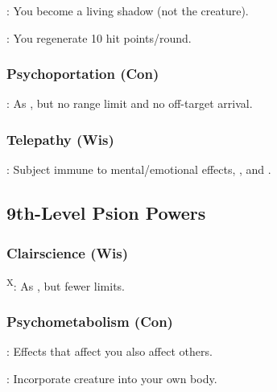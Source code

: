 : You become a living shadow (not the creature).

: You regenerate 10 hit points/round.


\subsubsection{Psychoportation (Con)}

: As , but no range limit and no off-target arrival.


\subsubsection{Telepathy (Wis)}

: Subject immune to mental/emotional effects, , and .



\subsection{9th-Level Psion Powers}


\subsubsection{Clairscience (Wis)}

\textsuperscript{X}: As , but fewer limits.






\subsubsection{Psychometabolism (Con)}

: Effects that affect you also affect others.

: Incorporate creature into your own body.


